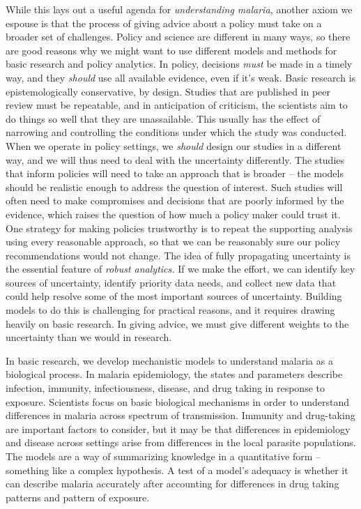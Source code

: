 \documentclass[
]{book}
\begin{document}
While this lays out a useful agenda for \emph{understanding malaria,} another axiom we espouse is that the process of giving advice about a policy must take on a broader set of challenges.
Policy and science are different in many ways, so there are good reasons why we might want to use different models and methods for basic research and policy analytics.
In policy, decisions \emph{must} be made in a timely way, and they \emph{should} use all available evidence, even if it's weak.
Basic research is epistemologically conservative, by design.
Studies that are published in peer review must be repeatable, and in anticipation of criticism, the scientists aim to do things so well that they are unassailable.
This usually has the effect of narrowing and controlling the conditions under which the study was conducted.
When we operate in policy settings, we \emph{should} design our studies in a different way, and we will thus need to deal with the uncertainty differently.
The studies that inform policies will need to take an approach that is broader -- the models should be realistic enough to address the question of interest.
Such studies will often need to make compromises and decisions that are poorly informed by the evidence, which raises the question of how much a policy maker could trust it.
One strategy for making policies trustworthy is to repeat the supporting analysis using every reasonable approach, so that we can be reasonably sure our policy recommendations would not change.
The idea of fully propagating uncertainty is the essential feature of \emph{robust analytics.}
If we make the effort, we can identify key sources of uncertainty, identify priority data needs, and collect new data that could help resolve some of the most important sources of uncertainty.
Building models to do this is challenging for practical reasons, and it requires drawing heavily on basic research.
In giving advice, we must give different weights to the uncertainty than we would in research.

In basic research, we develop mechanistic models to understand malaria as a biological process. In malaria epidemiology, the states and parameters describe infection, immunity, infectiousness, disease, and drug taking in response to exposure. Scientists focus on basic biological mechanisms in order to understand differences in malaria across spectrum of transmission. Immunity and drug-taking are important factors to consider, but it may be that differences in epidemiology and disease across settings arise from differences in the local parasite populations. The models are a way of summarizing knowledge in a quantitative form -- something like a complex hypothesis. A test of a model's adequacy is whether it can describe malaria accurately after accounting for differences in drug taking patterns and pattern of exposure.
\end{document}

